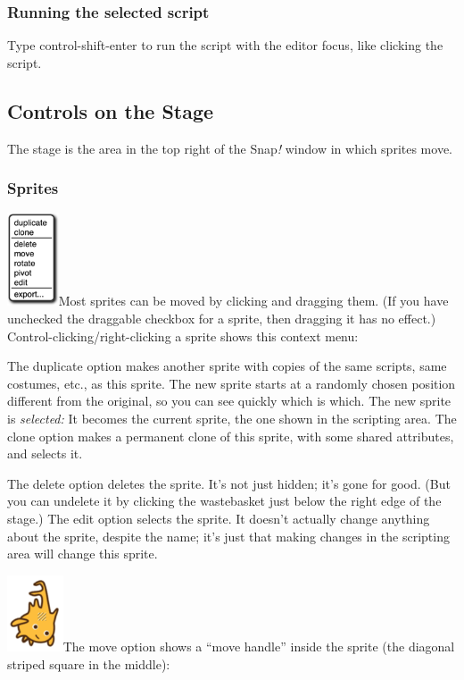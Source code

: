 \subsubsection{Running the selected
script}\label{running-the-selected-script}

Type control-shift-enter to run the script with the editor focus, like
clicking the script.

\subsection{Controls on the Stage}\label{controls-on-the-stage}

The stage is the area in the top right of the Snap\emph{!} window in
which sprites move.

\subsubsection{Sprites}\label{sprites}

\includegraphics[width=0.60139in,height=1.08333in]{media/image1112.png}Most
sprites can be moved by clicking and dragging them. (If you have
unchecked the draggable checkbox for a sprite, then dragging it has no
effect.) Control-clicking/right-clicking a sprite shows this context
menu:

The duplicate option makes another sprite with copies of the same
scripts, same costumes, etc., as this sprite. The new sprite starts at a
randomly chosen position different from the original, so you can see
quickly which is which. The new sprite is \emph{selected:} It becomes
the current sprite, the one shown in the scripting area. The clone
option makes a permanent clone of this sprite, with some shared
attributes, and selects it.

The delete option deletes the sprite. It's not just hidden; it's gone
for good. (But you can undelete it by clicking the wastebasket just
below the right edge of the stage.) The edit option selects the sprite.
It doesn't actually change anything about the sprite, despite the name;
it's just that making changes in the scripting area will change this
sprite.

\includegraphics[width=0.65278in,height=0.88889in]{media/image1113.png}The
move option shows a ``move handle'' inside the sprite (the diagonal
striped square in the middle):

